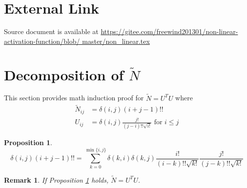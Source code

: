 \documentclass{article}
\newtheorem{remark}{Remark}
\newtheorem{proposition}{Proposition}
\begin{document}
\section{External Link}
Source document is available at
\url{https://gitee.com/freewind201301/non-linear-activation-function/blob/
master/non_linear.tex}

\appendix
\section{Decomposition of $\widetilde{N}$}
This section provides math induction proof for $\widetilde{N}= U^T U$ where
\begin{align}
\widetilde{N}_{ij} & = \delta(i, j) (i+j-1)!! \\
U_{ij} & = \delta(i, j) \frac{j!}{(j-i)!!\sqrt{i!}} \textrm{ for } i\leq j
\end{align}
\begin{proposition}\label{prop:UUN}
\begin{equation}
\delta(i, j) (i+j-1)!! = \sum_{k=0}^{\min\{i, j\}}
\delta(k, i) \delta(k, j) \frac{i!}{(i-k)!!\sqrt{k!}}
\frac{j!}{(j-k)!!\sqrt{k!}}
\end{equation}
\end{proposition}
\begin{remark}
If Proposition \ref{prop:UUN} holds, $\widetilde{N} = U^T U$.
\end{remark}
\end{document}
